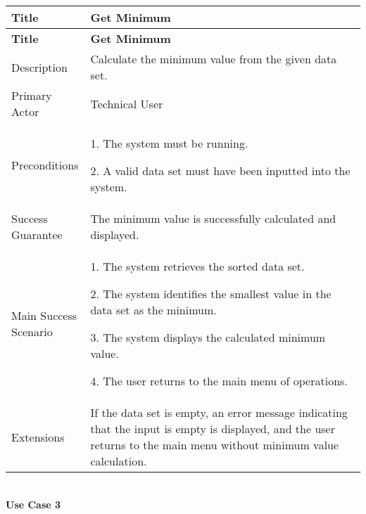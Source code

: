    \begin{longtable}{|p{0.227\linewidth}|p{0.773\linewidth}|}
    \hline
    \textbf{Title} & \textbf{Get Minimum} \\
    \hline
    \endfirsthead
    \hline
    \textbf{Title} & \textbf{Get Minimum} \\
    \hline
    \endhead
    \hline
    \endfoot
    \hline
    \endlastfoot
    Description & Calculate the minimum value from the given data set. \\ \hline
    Primary Actor & Technical User \\ \hline
    Preconditions & 1. The system must be running.
    
    2. A valid data set must have been inputted into the system. \\ \hline
    Success Guarantee & The minimum value is successfully calculated and
    displayed. \\ \hline
    Main Success Scenario & 1. The system retrieves the sorted data set.
    
    2. The system identifies the smallest value in the data set as the
    minimum.
    
    3. The system displays the calculated minimum value.
    
    4. The user returns to the main menu of operations. \\
    \hline
    Extensions & If the data set is empty, an error message indicating that
    the input is empty is displayed, and the user returns to the main menu
    without minimum value calculation.
    \end{longtable}
    \strut \\
    \textbf{\large Use Case 3}
    
